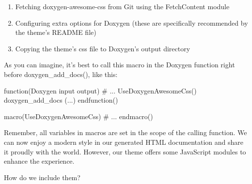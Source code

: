 \begin{enumerate}
\item
Fetching doxygen-awesome-css from Git using the FetchContent module

\item
Configuring extra options for Doxygen (these are specifically recommended by the theme’s README file)

\item
Copying the theme’s css file to Doxygen’s output directory
\end{enumerate}

As you can imagine, it’s best to call this macro in the Doxygen function right before doxygen\_add\_docs(), like this:


\begin{cmake}
function(Doxygen input output)
# ...
UseDoxygenAwesomeCss()
doxygen_add_docs (...)
endfunction()

macro(UseDoxygenAwesomeCss)
# ...
endmacro()
\end{cmake}

Remember, all variables in macros are set in the scope of the calling function.
We can now enjoy a modern style in our generated HTML documentation and share it proudly with the world. However, our theme offers some JavaScript modules to enhance the experience.

How do we include them?









































































